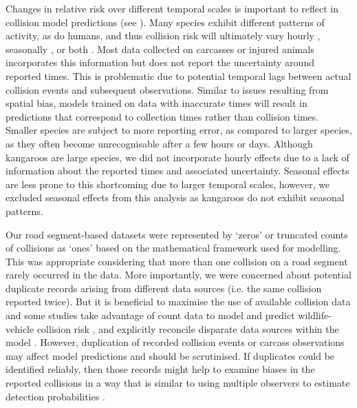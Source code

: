 Changes in relative risk over different temporal scales is important to reflect in collision model predictions (see ). Many species exhibit different patterns of activity, as do humans, and thus collision risk will ultimately vary hourly \citep[e.g][]{joyc01}, seasonally \citep[e.g][]{alve12,beau10,gril09}, or both \citep[e.g][]{mizu14,more13}. Most data collected on carcasses or injured animals incorporates this information but does not report the uncertainty around reported times. This is problematic due to potential temporal lags between actual collision events and subsequent observations. Similar to issues resulting from spatial bias, models trained on data with inaccurate times will result in predictions that correspond to collection times rather than collision times. Smaller species are subject to more reporting error, as compared to larger species, as they often become unrecognisable after a few hours or days. Although kangaroos are large species, we did not incorporate hourly effects due to a lack of information about the reported times and associated uncertainty. Seasonal effects are less prone to this shortcoming due to larger temporal scales, however, we excluded seasonal effects from this analysis as kangaroos do not exhibit seasonal patterns. 

Our road segment-based datasets were represented by `zeros' or truncated counts of collisions as `ones' based on the mathematical framework used for modelling. This was appropriate considering that more than one collision on a road segment rarely occurred in the data. More importantly, we were concerned about potential duplicate records arising from different data sources (i.e. the same collision reported twice). But it is beneficial to maximise the use of available collision data and some studies take advantage of count data to model and predict wildlife-vehicle collision risk \citep[e.g.][]{cser13}, and explicitly reconcile disparate data sources within the model \citep[e.g.][]{lao11a}. However, duplication of recorded collision events or carcass observations may affect model predictions and should be scrutinised. If duplicates could be identified reliably, then those records might help to examine biases in the reported collisions in a way that is similar to using multiple observers to estimate detection probabilities \citep[see][]{nich00}.

